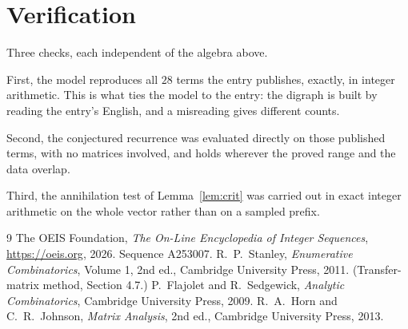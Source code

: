 \documentclass[11pt,a4paper]{article}
\theoremstyle{plain}
\theoremstyle{definition}
\begin{document}
\section{Verification}

Three checks, each independent of the algebra above.

First, the model reproduces all $28$ terms the entry publishes, exactly, in integer
arithmetic. This is what ties the model to the entry: the digraph is built by reading the
entry's English, and a misreading gives different counts.

Second, the conjectured recurrence was evaluated directly on those published terms, with no
matrices involved, and holds wherever the proved range and the data overlap.

Third, the annihilation test of Lemma~\ref{lem:crit} was carried out in exact integer
arithmetic on the whole vector rather than on a sampled prefix.

\begin{thebibliography}{9}
 The OEIS Foundation, \emph{The On-Line Encyclopedia of Integer
Sequences}, \url{https://oeis.org}, 2026. Sequence A253007.
 R.~P.~Stanley, \emph{Enumerative Combinatorics}, Volume 1, 2nd ed.,
Cambridge University Press, 2011. (Transfer-matrix method, Section 4.7.)
 P.~Flajolet and R.~Sedgewick, \emph{Analytic Combinatorics}, Cambridge
University Press, 2009.
 R.~A.~Horn and C.~R.~Johnson, \emph{Matrix Analysis}, 2nd ed., Cambridge
University Press, 2013.
\end{thebibliography}
\end{document}
